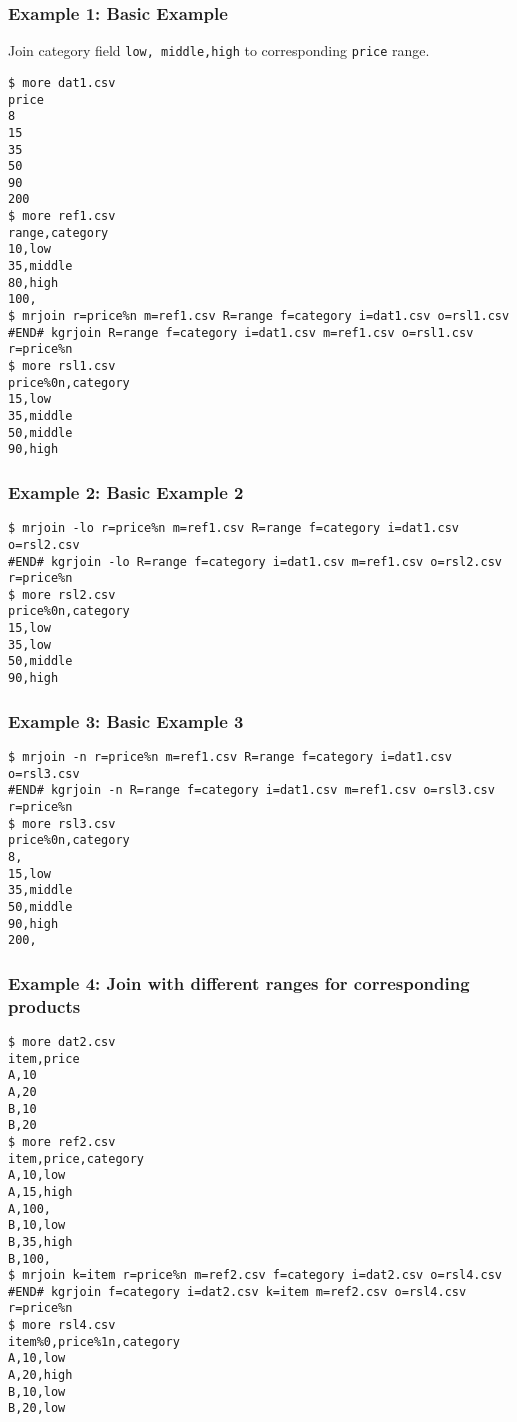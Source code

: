 \subsubsection*{Example 1: Basic Example}

Join category field \verb|low, middle,high| to corresponding \verb|price| range.


\begin{Verbatim}[baselinestretch=0.7,frame=single]
$ more dat1.csv
price
8
15
35
50
90
200
$ more ref1.csv
range,category
10,low
35,middle
80,high
100,
$ mrjoin r=price%n m=ref1.csv R=range f=category i=dat1.csv o=rsl1.csv
#END# kgrjoin R=range f=category i=dat1.csv m=ref1.csv o=rsl1.csv r=price%n
$ more rsl1.csv
price%0n,category
15,low
35,middle
50,middle
90,high
\end{Verbatim}
\subsubsection*{Example 2: Basic Example 2}



\begin{Verbatim}[baselinestretch=0.7,frame=single]
$ mrjoin -lo r=price%n m=ref1.csv R=range f=category i=dat1.csv o=rsl2.csv
#END# kgrjoin -lo R=range f=category i=dat1.csv m=ref1.csv o=rsl2.csv r=price%n
$ more rsl2.csv
price%0n,category
15,low
35,low
50,middle
90,high
\end{Verbatim}
\subsubsection*{Example 3: Basic Example 3}



\begin{Verbatim}[baselinestretch=0.7,frame=single]
$ mrjoin -n r=price%n m=ref1.csv R=range f=category i=dat1.csv o=rsl3.csv
#END# kgrjoin -n R=range f=category i=dat1.csv m=ref1.csv o=rsl3.csv r=price%n
$ more rsl3.csv
price%0n,category
8,
15,low
35,middle
50,middle
90,high
200,
\end{Verbatim}
\subsubsection*{Example 4: Join with different ranges for corresponding products}



\begin{Verbatim}[baselinestretch=0.7,frame=single]
$ more dat2.csv
item,price
A,10
A,20
B,10
B,20
$ more ref2.csv
item,price,category
A,10,low
A,15,high
A,100,
B,10,low
B,35,high
B,100,
$ mrjoin k=item r=price%n m=ref2.csv f=category i=dat2.csv o=rsl4.csv
#END# kgrjoin f=category i=dat2.csv k=item m=ref2.csv o=rsl4.csv r=price%n
$ more rsl4.csv
item%0,price%1n,category
A,10,low
A,20,high
B,10,low
B,20,low
\end{Verbatim}
